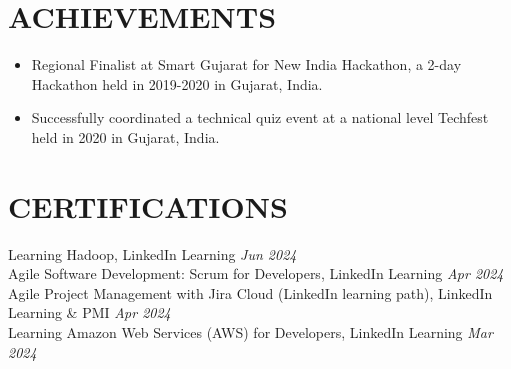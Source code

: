 \documentclass[10pt, letterpaper]{article}
\begin{document}
\vspace{0.1cm}
\section{ACHIEVEMENTS}
\vspace{0.1cm}
\begin{itemize}
    \item Regional Finalist at Smart Gujarat for New India Hackathon, a 2-day Hackathon held in 2019-2020 in Gujarat, India.
    \item Successfully coordinated a technical quiz event at a national level Techfest held in 2020 in Gujarat, India.
\end{itemize}
\vspace{0.1cm}
\section*{CERTIFICATIONS}
\vspace{0.1cm}
Learning Hadoop, LinkedIn Learning \hfill \textit{Jun 2024} \\
Agile Software Development: Scrum for Developers, LinkedIn Learning \hfill \textit{Apr 2024} \\
Agile Project Management with Jira Cloud (LinkedIn learning path), LinkedIn Learning \& PMI \hfill \textit{Apr 2024} \\
Learning Amazon Web Services (AWS) for Developers, LinkedIn Learning \hfill \textit{Mar 2024} \\
\end{document}
